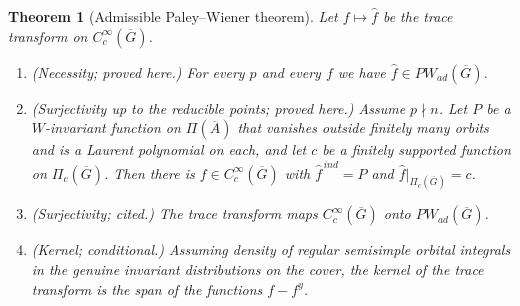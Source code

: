 \documentclass[12pt,letterpaper]{article}
\numberwithin{equation}{section}
\newtheorem{theorem}{Theorem}[section]
\theoremstyle{definition}
\newcommand{\proved}{proved here}
\newcommand{\cited}{cited}
\newcommand{\cond}{conditional}
\newcommand{\bG}{\overline{G}}
\newcommand{\bA}{\overline{A}}
\begin{document}
\begin{theorem}[Admissible Paley--Wiener theorem]\label{thm:PWad}
Let $f\mapsto\hat f$ be the trace transform on $C_c^\infty(\bG)$.
\begin{enumerate}[label=(\alph*),leftmargin=*,itemsep=1pt]
\item (Necessity; \proved.)  For every $p$ and every $f$ we have $\hat f\in PW_{ad}(\bG)$.
\item (Surjectivity up to the reducible points; \proved.)  Assume $p\nmid n$.  Let $P$ be a
$W$-invariant function on $\Pi(\bA)$ that vanishes outside finitely many orbits and is a
Laurent polynomial on each, and let $c$ be a finitely supported function on $\Pi_c(\bG)$.
Then there is $f\in C_c^\infty(\bG)$ with $\hat f^{\,ind}=P$ and $\hat f|_{\Pi_c(\bG)}=c$.
\item (Surjectivity; \cited.)  The trace transform maps $C_c^\infty(\bG)$ onto
$PW_{ad}(\bG)$.
\item (Kernel; \cond.) Assuming density of regular semisimple orbital integrals
in the genuine invariant distributions on the cover, the kernel of the trace
transform is the span of the functions $f-f^y$.
\end{enumerate}
\end{theorem}
\end{document}
